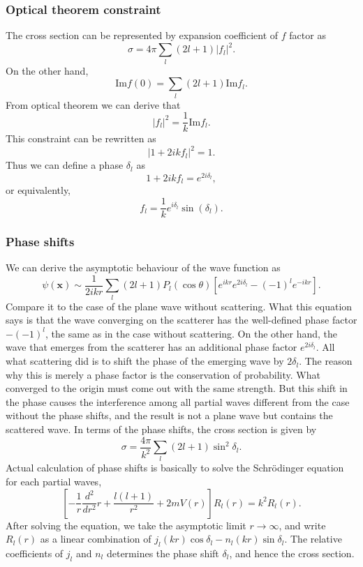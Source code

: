\subsubsection{Optical theorem constraint}
\noindent
The cross section can be represented by expansion coefficient of $f$ factor as
\[\sigma = 4\pi \sum_l (2l+1)|f_l|^2.\]
On the other hand, 
\[\mathrm{Im} f(0) = \sum_l (2l+1) \mathrm{Im} f_l.\]
From optical theorem we can derive that
\[|f_l|^2 = \frac{1}{k} \mathrm{Im} f_l.\]
This constraint can be rewritten as
\[|1+2ikf_l|^2 = 1.\]
Thus we can define a phase $\delta_l$ as 
\[1+2ikf_l = e^{2i\delta_l},\]
or equivalently,
\[f_l = \frac{1}{k} e^{i\delta_l} \sin(\delta_l).\]

\subsubsection{Phase shifts}
\noindent
We can derive the asymptotic behaviour of the wave function as
\[\psi(\bm{x}) \sim \frac{1}{2ikr} \sum_{l} (2l+1)P_l(\cos \theta) [e^{ikr}e^{2i\delta_l} - (-1)^l e^{-ikr}].\]
Compare it to the case of the plane wave without scattering. What this equation says is that the wave converging on the scatterer
has the well-defined phase factor $-(-1)^l$, the same as in the case without scattering. On the other hand, the wave that emerges from the scatterer has an additional phase factor $e^{2i\delta_l}$. All what scattering did is to shift the phase of the emerging wave by $2\delta_l$. The reason why this is merely a phase factor is
the conservation of probability. What converged to the origin must come out with the same strength. But this shift in the phase causes the interference among all partial waves different from the case without the phase shifts, and the result is not a plane wave but contains the scattered wave.
In terms of the phase shifts, the cross section is given by
\[\sigma = \frac{4\pi}{k^2} \sum_l (2l+1) \sin^2\delta_l.\]
Actual calculation of phase shifts is basically to solve the Schr\"{o}dinger equation for each partial waves,
\[\left[-\frac{1}{r}\frac{d^2}{dr^2}r+\frac{l(l+1)}{r^2}+2mV(r)\right]R_l(r) = k^2 R_l(r).\]
After solving the equation, we take the asymptotic limit $r \to \infty$, and write $R_l(r)$ as a linear combination of $j_l(kr)\cos \delta_l - n_l(kr) \sin \delta_l $. The relative coefficients of $j_l$ and $n_l$ determines the phase shift $\delta_l$, and hence the cross section.

